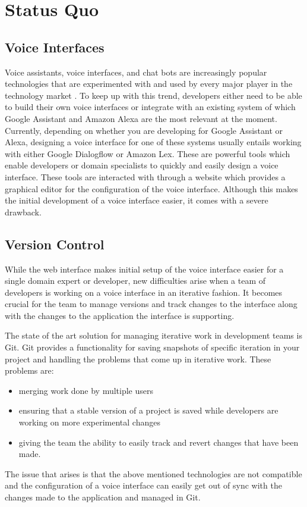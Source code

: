 \chapter{Status Quo}
\section{Voice Interfaces}
Voice assistants, voice interfaces, and chat bots are increasingly popular technologies that are experimented with and used by every major player in the technology market \cite{Chatbots2018}. To keep up with this trend, developers either need to be able to build their own voice interfaces or integrate with an existing system of which Google Assistant and Amazon Alexa are the most relevant at the moment. \citeNeeded
Currently, depending on whether you are developing for Google Assistant or Alexa, designing a voice interface for one of these systems usually entails working with either Google Dialogflow or Amazon Lex. These are powerful tools which enable developers or domain specialists to quickly and easily design a voice interface.
These tools are interacted with through a website which provides a graphical editor for the configuration of the voice interface. Although this makes the initial development of a voice interface easier, it comes with a severe drawback.

\section{Version Control}
While the web interface makes initial setup of the voice interface easier for a single domain expert or developer, new difficulties arise when a team of developers is working on a voice interface in an iterative fashion. It becomes crucial for the team to manage versions and track changes to the interface along with the changes to the application the interface is supporting. \citeNeeded

The state of the art solution for managing iterative work in development teams is Git. \citeNeeded
Git provides a functionality for saving snapshots of specific iteration in your project and handling the problems that come up in iterative work.
These problems are:
\begin{itemize}
    \item merging work done by multiple users
    \item ensuring that a stable version of a project is saved while developers are working on more experimental changes
    \item giving the team the ability to easily track and revert changes that have been made.
\end{itemize}
The issue that arises is that the above mentioned technologies are not compatible and the configuration of a voice interface can easily get out of sync with the changes made to the application and managed in Git.

